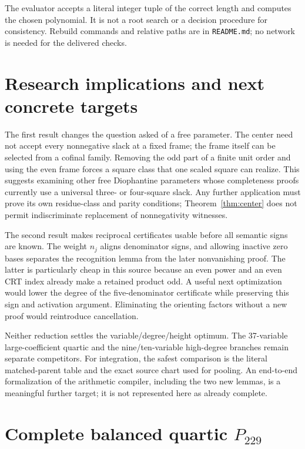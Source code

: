 \documentclass[10pt,letterpaper]{article}
\theoremstyle{definition}\newtheorem{definition}[theorem]{Definition}
\theoremstyle{remark}\newtheorem{remark}[theorem]{Remark}
\begin{document}
The evaluator accepts a literal integer tuple of the correct length and
computes the chosen polynomial. It is not a root search or a decision
procedure for consistency. Rebuild commands and relative paths are in
\texttt{README.md}; no network is needed for the delivered checks.

\section{Research implications and next concrete targets}

The first result changes the question asked of a free parameter. The
center need not accept every nonnegative slack at a fixed frame; the
frame itself can be selected from a cofinal family. Removing the odd
part of a finite unit order and using the even frame forces a square
class that one scaled square can realize. This suggests examining other
free Diophantine parameters whose completeness proofs currently use a
universal three- or four-square slack. Any further application must
prove its own residue-class and parity conditions; Theorem~\ref{thm:center}
does not permit indiscriminate replacement of nonnegativity witnesses.

The second result makes reciprocal certificates usable before all
semantic signs are known. The weight $n_j$ aligns denominator signs,
and allowing inactive zero bases separates the recognition lemma from
the later nonvanishing proof. The latter is particularly cheap in this
source because an even power and an even CRT index already make a
retained product odd. A useful next optimization would lower the degree
of the five-denominator certificate while preserving this sign and
activation argument. Eliminating the orienting factors without a new
proof would reintroduce cancellation.

Neither reduction settles the variable/degree/height optimum. The
37-variable large-coefficient quartic and the nine/ten-variable
high-degree branches remain separate competitors. For integration,
the safest comparison is the literal matched-parent table and the
exact source chart used for pooling. An end-to-end formalization of
the arithmetic compiler, including the two new lemmas, is a meaningful
further target; it is not represented here as already complete.

\appendix
\section{Complete balanced quartic \texorpdfstring{$P_{229}$}{P229}}
\end{document}
